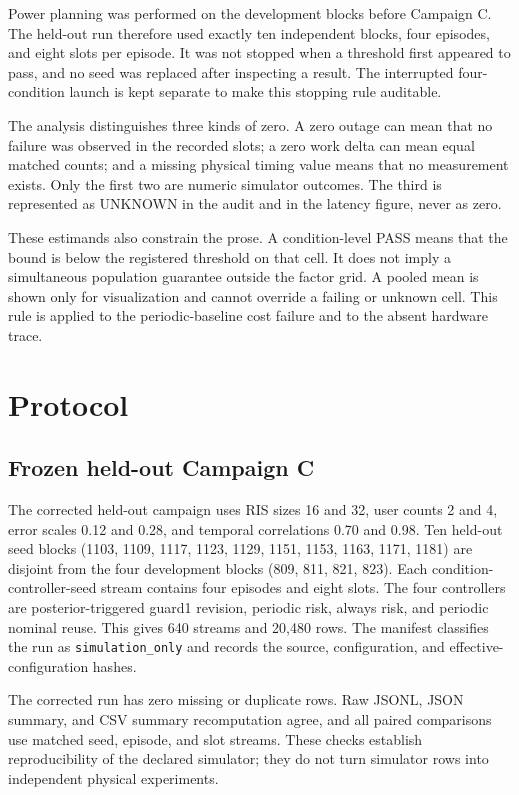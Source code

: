 \documentclass[10pt,twocolumn]{article}
\begin{document}
Power planning was performed on the development blocks before Campaign
C. The held-out run therefore used exactly ten independent blocks, four
episodes, and eight slots per episode. It was not stopped when a
threshold first appeared to pass, and no seed was replaced after
inspecting a result. The interrupted four-condition launch is kept
separate to make this stopping rule auditable.

The analysis distinguishes three kinds of zero. A zero outage can mean
that no failure was observed in the recorded slots; a zero work delta
can mean equal matched counts; and a missing physical timing value means
that no measurement exists. Only the first two are numeric simulator
outcomes. The third is represented as UNKNOWN in the audit and in the
latency figure, never as zero.

These estimands also constrain the prose. A condition-level PASS means
that the bound is below the registered threshold on that cell. It does
not imply a simultaneous population guarantee outside the factor grid. A
pooled mean is shown only for visualization and cannot override a
failing or unknown cell. This rule is applied to the periodic-baseline
cost failure and to the absent hardware trace.

\section{Protocol}\label{protocol}

\subsection{Frozen held-out Campaign
C}\label{frozen-held-out-campaign-c}

The corrected held-out campaign uses RIS sizes 16 and 32, user counts 2
and 4, error scales 0.12 and 0.28, and temporal correlations 0.70 and
0.98. Ten held-out seed blocks (1103, 1109, 1117, 1123, 1129, 1151,
1153, 1163, 1171, 1181) are disjoint from the four development blocks
(809, 811, 821, 823). Each condition-controller-seed stream contains
four episodes and eight slots. The four controllers are
posterior-triggered guard1 revision, periodic risk, always risk, and
periodic nominal reuse. This gives 640 streams and 20,480 rows. The
manifest classifies the run as \texttt{simulation\_only} and records the
source, configuration, and effective-configuration hashes.

The corrected run has zero missing or duplicate rows. Raw JSONL, JSON
summary, and CSV summary recomputation agree, and all paired comparisons
use matched seed, episode, and slot streams. These checks establish
reproducibility of the declared simulator; they do not turn simulator
rows into independent physical experiments.
\end{document}
